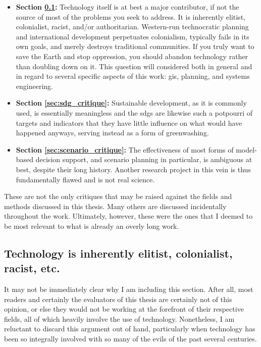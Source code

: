 \begin{itemize} \setlength{\itemsep}{0pt} \setlength{\parskip}{0pt} 
	\item{\textbf{Section \ref{sec:elitism}:} Technology itself is at best a major contributor, if not the source of most of the problems you seek to address. It is inherently elitist, colonialist, racist, and/or authoritarian. Western-run technocratic planning and international development perpetuates colonialism, typically fails in its own goals, and merely destroys traditional communities. If you truly want to save the Earth and stop oppression, you should abandon technology rather than doubling down on it. This question will considered both in general and in regard to several specific aspects of this work: \ac{gis}, planning, and systems engineering.}	
	\item{\textbf{Section \ref{sec:sdg_critique}:} Sustainable development, as it is commonly used, is essentially meaningless and the \acp{sdg} are likewise such a potpourri of targets and indicators that they have little influence on what would have happened anyways, serving instead as a form of greenwashing.}
	\item{\textbf{Section \ref{sec:scenario_critique}:} The effectiveness of most forms of model-based decision support, and scenario planning in particular, is ambiguous at best, despite their long history. Another research project in this vein is thus fundamentally flawed and is not real science.}	
\end{itemize}

These are not the only critiques that may be raised against the fields and methods discussed in this thesis. Many others are discussed incidentally throughout the work. Ultimately, however, these were the ones that I deemed to be most relevant to what is already an overly long work.


\subsection{Technology is inherently elitist, colonialist, racist, etc.} \label{sec:elitism}

It may not be immediately clear why I am including this section. After all, most readers and certainly the evaluators of this thesis are certainly not of this opinion, or else they would not be working at the forefront of their respective fields, all of which heavily involve the use of technology. Nonetheless, I am reluctant to discard this argument out of hand, particularly when technology has been so integrally involved with so many of the evils of the past several centuries.

